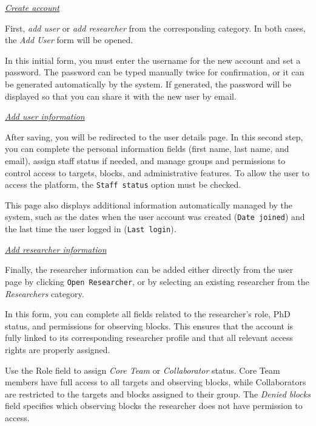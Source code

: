 \underline{\textsl{Create account}}

First, \textsl{add user} or \textsl{add researcher} from the corresponding category. In both cases, the \textsl{Add User} form will be opened. 

In this initial form, you must enter the username for the new account and set a password. The password can be typed manually twice for confirmation, or it can be generated automatically by the system. If generated, the password will be displayed so that you can share it with the new user by email.


\underline{\textsl{Add user information}}

After saving, you will be redirected to the user details page. In this second step, you can complete the personal information fields (first name, last name, and email), assign staff status if needed, and manage groups and permissions to control access to targets, blocks, and administrative features. To allow the user to access the platform, the \texttt{Staff status} option must be checked.


This page also displays additional information automatically managed by the system, such as the dates when the user account was created (\texttt{Date joined}) and the last time the user logged in (\texttt{Last login}).


\underline{\textsl{Add researcher information}}

Finally, the researcher information can be added either directly from the user page by clicking \texttt{Open Researcher}, or by selecting an existing researcher from the \textsl{Researchers} category. 

In this form, you can complete all fields related to the researcher’s role, PhD status, and permissions for observing blocks. This ensures that the account is fully linked to its corresponding researcher profile and that all relevant access rights are properly assigned. 

Use the Role field to assign \textsl{Core Team} or \textsl{Collaborator} status. Core Team members have full access to all targets and observing blocks, while Collaborators are restricted to the targets and blocks assigned to their group. The \textsl{Denied blocks} field specifies which observing blocks the researcher does not have permission to access.

